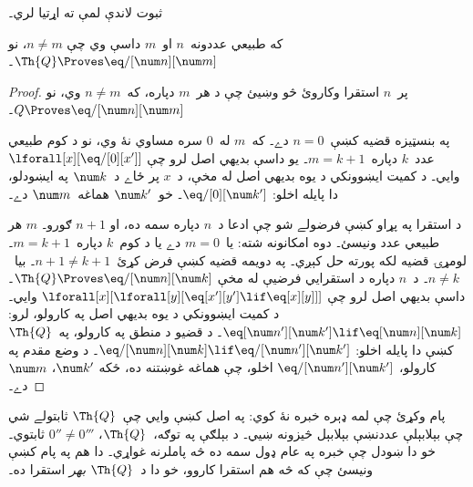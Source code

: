 \documentclass[../../../include/open-logic-section]{subfiles}
\begin{document}
ثبوت لاندې لمې ته اړتيا لري۔

\begin{lem}
 که طبيعي عددونه~$n$ او~$m$ داسې وي چې
$n \neq m$، نو $\Th{Q} \Proves \eq/[\num n][\num m]$۔
\end{lem}

\begin{proof}
پر~$n$ استقرا وکاروئ څو وښيئ چې د هر~$m$ دپاره، که~$n \neq m$
وي، نو $Q \Proves \eq/[\num n][\num m]$۔

په بنسټيزه قضيه کښې~$n = 0$ دے۔ که~$m$ له~$0$ سره مساوي نۀ وي، نو
د کوم طبيعي عدد~$k$ دپاره~$m = k + 1$۔ يو داسې بديهي اصل لرو چې
$\lforall[x][\eq/[0][x']]$ وايي۔ د کمیت ايښوونکي د يوه بديهي اصل له
مخې، د~$x$ پر ځاے د~$\num k$ په ايښودلو، دا پايله اخلو:
$\eq/[0][\num k']$۔ خو~$\num k'$ هماغه~$\num m$ دے۔

د استقرا په پړاو کښې فرضولے شو چې ادعا د~$n$ دپاره سمه ده، او
$n+1$ ګورو۔ $m$ هر طبيعي عدد ونيسئ۔ دوه امکانونه شته: يا~$m = 0$
دے يا د کوم~$k$ دپاره~$m = k+1$۔ لومړۍ قضيه لکه پورته حل کېږي۔ په
دويمه قضيه کښې فرض کړئ~$n+1 \neq k+1$۔ بيا~$n \neq k$۔ د~$n$
دپاره د استقرايي فرضيې له مخې
$\Th{Q} \Proves \eq/[\num n][\num k]$۔ داسې بديهي اصل لرو چې
$\lforall[x][\lforall[y][\eq[x'][y'] \lif \eq[x][y]]]$ وايي۔ د
کمیت ايښوونکي د يوه بديهي اصل په کارولو، لرو:
$\eq[\num n'][\num k'] \lif \eq[\num n][\num k]$۔ د قضيو د منطق په
کارولو، په~$\Th{Q}$ کښې دا پايله اخلو:
$\eq/[\num n][\num k] \lif \eq/[\num n'][\num k']$۔ د وضع مقدم په
کارولو، $\eq/[\num n'][\num k']$ اخلو، چې هماغه غوښتنه ده، ځکه
$\num k'$، $\num m$ دے۔
\end{proof}

\begin{explain}
پام وکړئ چې لمه ډېره خبره نۀ کوي: په اصل کښې وايي چې~$\Th{Q}$
ثابتولے شي چې بېلابېلې عددنښې بېلابېل څيزونه ښيي۔ د بېلګې په
توګه،~$\Th{Q}$، $0'' \neq 0'''$ ثابتوي۔ خو دا ښودل چې خبره په عام
ډول سمه ده څه پاملرنه غواړي۔ دا هم په پام کښې ونيسئ چې که څه هم
استقرا کاروو، خو دا د~$\Th{Q}$ \emph{بهر} استقرا ده۔
\end{explain}
\end{document}
